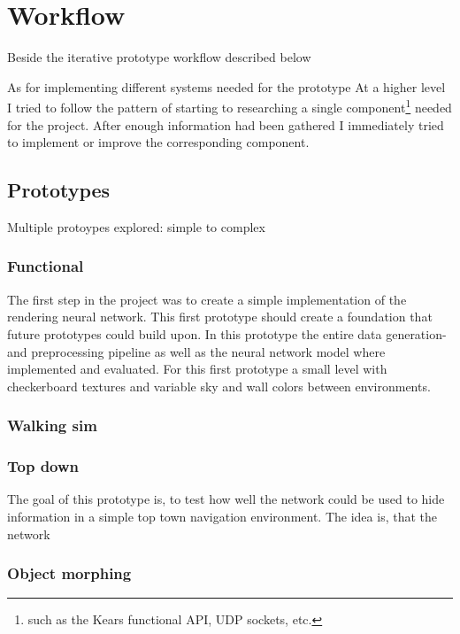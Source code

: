 
\chapter{Workflow}
Beside the iterative prototype workflow described below

As for implementing different systems needed for the prototype At a higher level I tried to follow the pattern of starting to researching a single component\footnote{such as the Kears functional API, UDP sockets, etc.} needed for the project. After enough information had been gathered I immediately tried to implement or improve the corresponding component.


\section{Prototypes}
Multiple protoypes explored: simple to complex


\subsection{Functional}
The first step in the project was to create a simple implementation of the rendering neural network. This first prototype should create a foundation that future prototypes could build upon. In this prototype the entire data generation- and preprocessing pipeline as well as the neural network model where implemented and evaluated. For this first prototype a small level with checkerboard textures and variable sky and wall colors between environments.



\subsection{Walking sim}


\subsection{Top down}
The goal of this prototype is, to test how well the network could be used to hide information in a simple top town navigation environment.
The idea is, that the network



\subsection{Object morphing}

